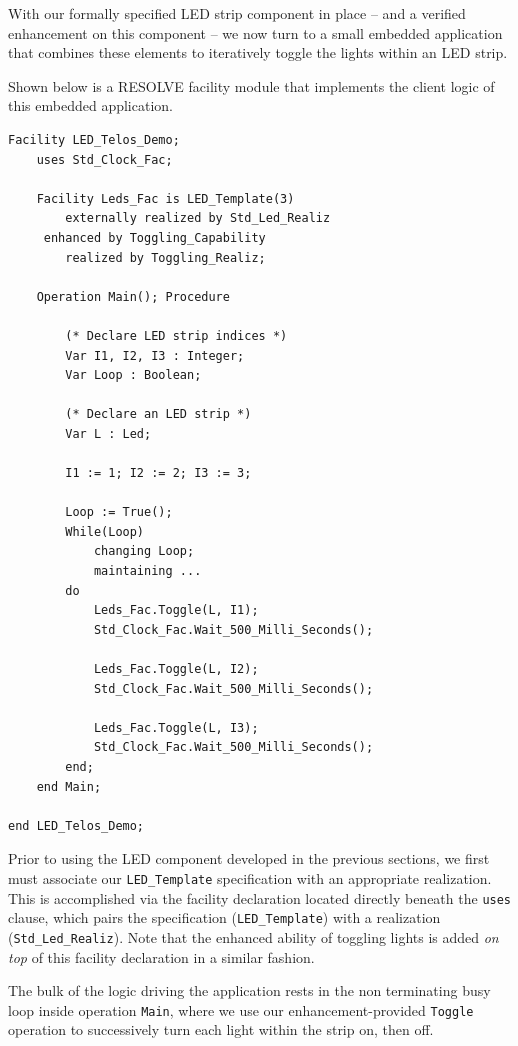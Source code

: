 With our formally specified LED strip component in place -- and a verified enhancement on this component -- we now turn to a small embedded application that combines these elements to iteratively toggle the lights within an LED strip.

Shown below is a RESOLVE facility module that implements the client logic of this embedded application.
\begin{verbatim}
Facility LED_Telos_Demo;
    uses Std_Clock_Fac;
    
    Facility Leds_Fac is LED_Template(3)
        externally realized by Std_Led_Realiz
     enhanced by Toggling_Capability
        realized by Toggling_Realiz;
        
    Operation Main(); Procedure
    
        (* Declare LED strip indices *)
        Var I1, I2, I3 : Integer;
        Var Loop : Boolean;
        
        (* Declare an LED strip *)
        Var L : Led;
        
        I1 := 1; I2 := 2; I3 := 3;
        
        Loop := True();
        While(Loop)
            changing Loop;
            maintaining ...
        do
            Leds_Fac.Toggle(L, I1);
            Std_Clock_Fac.Wait_500_Milli_Seconds();
            
            Leds_Fac.Toggle(L, I2);
            Std_Clock_Fac.Wait_500_Milli_Seconds();
            
            Leds_Fac.Toggle(L, I3);
            Std_Clock_Fac.Wait_500_Milli_Seconds();
        end;
    end Main;
    
end LED_Telos_Demo;
\end{verbatim}
Prior to using the LED component developed in the previous sections, we first must associate our \texttt{LED\_Template} specification with an appropriate realization. This is accomplished via the facility declaration located directly beneath the \texttt{uses} clause, which pairs the specification (\texttt{LED\_Template}) with a realization (\texttt{Std\_Led\_Realiz}). Note that the enhanced ability of toggling lights is added \textit{on top} of this facility declaration in a similar fashion.

The bulk of the logic driving the application rests in the non terminating busy loop inside operation \texttt{Main}, where we use our enhancement-provided \texttt{Toggle} operation to successively turn each light within the strip on, then off.

